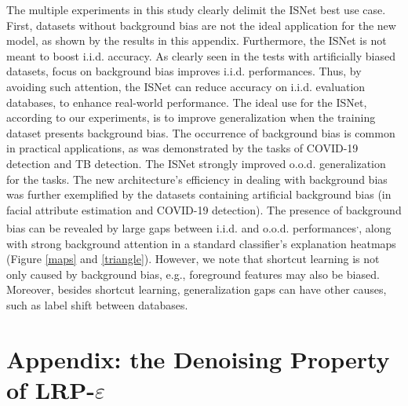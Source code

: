 \documentclass[fleqn,10pt]{wlscirep}
\begin{document}
{The multiple experiments in this study clearly delimit the ISNet best use case. First, datasets without background bias are not the ideal application for the new model, as shown by the results in this appendix. Furthermore, the ISNet is not meant to boost i.i.d. accuracy. As clearly seen in the tests with artificially biased datasets, focus on background bias improves i.i.d. performances. Thus, by avoiding such attention, the ISNet can reduce accuracy on i.i.d. evaluation databases, to enhance real-world performance. The ideal use for the ISNet, according to our experiments, is to improve generalization when the training dataset presents background bias. The occurrence of background bias is common in practical applications, as was demonstrated by the tasks of COVID-19 detection and TB detection. The ISNet strongly improved o.o.d. generalization for the tasks. The new architecture's efficiency in dealing with background bias was further exemplified by the datasets containing artificial background bias (in facial attribute estimation and COVID-19 detection). The presence of background bias can be revealed by large gaps between i.i.d. and o.o.d. performances\cite{ShortcutCovid}\textsuperscript{,}\cite{ShortcutLearning}, along with strong background attention in a standard classifier's explanation heatmaps (Figure \ref{maps} and \ref{triangle}). However, we note that shortcut learning is not only caused by background bias\cite{ShortcutLearning}, e.g., foreground features may also be biased. Moreover, besides shortcut learning, generalization gaps can have other causes, such as label shift between databases\cite{LabelShift}.


\section{Appendix: the Denoising Property of LRP-$\varepsilon$}
\label{lrpVsGradInput}

}
\end{document}

